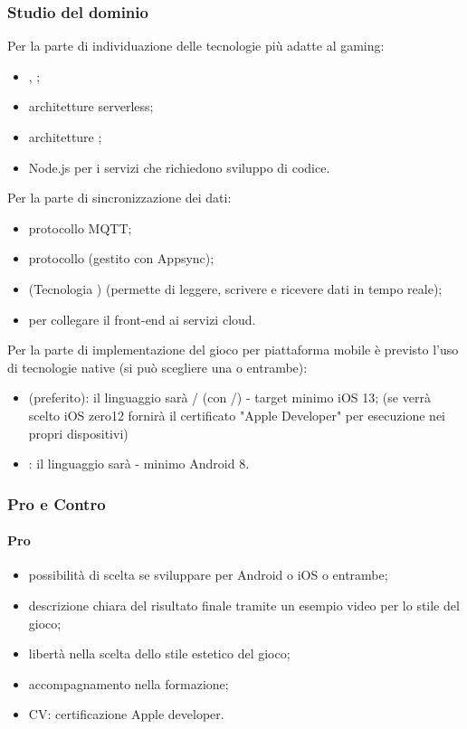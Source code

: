 \subsubsection{Studio del dominio}
Per la parte di individuazione delle tecnologie più adatte al gaming:
\begin{itemize}
	\item {}, ;
	\item architetture serverless;
	\item architetture ;
	\item Node.js per i servizi che richiedono sviluppo di codice.
\end{itemize}
Per la parte di sincronizzazione dei dati:
\begin{itemize}
	\item protocollo MQTT;
	\item protocollo  (gestito con Appsync);
	\item {} (Tecnologia ) (permette di leggere, scrivere e ricevere dati in tempo reale);
	\item {} per collegare il front-end ai servizi cloud.
\end{itemize}
Per la parte di implementazione del gioco per piattaforma mobile è previsto l'uso di tecnologie native (si può scegliere una o entrambe):
\begin{itemize}
	\item {} (preferito): il linguaggio sarà / (con /) - target minimo iOS 13; (se verrà scelto iOS zero12 fornirà il certificato "Apple Developer" per esecuzione nei propri dispositivi)
	\item {}: il linguaggio sarà  - minimo Android 8.
\end{itemize}
\subsubsection{Pro e Contro}
\paragraph*{Pro}
\begin{itemize}
	\item possibilità di scelta se sviluppare per Android o iOS o entrambe;
	\item descrizione chiara del risultato finale tramite un esempio video per lo stile del gioco;
	\item libertà nella scelta dello stile estetico del gioco;
	\item accompagnamento nella formazione;
	\item CV: certificazione Apple developer.
\end{itemize}
